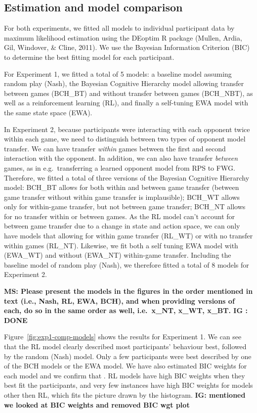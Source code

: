 \documentclass[english,man,floatsintext]{apa6}
\begin{document}
\hypertarget{estimation-and-model-comparison}{%
\subsection{Estimation and model comparison}\label{estimation-and-model-comparison}}

For both experiments, we fitted all models to individual participant data by maximum likelihood estimation using the DEoptim R package (Mullen, Ardia, Gil, Windover, \& Cline, 2011). We use the Bayesian Information Criterion (BIC) to determine the best fitting model for each participant.

For Experiment 1, we fitted a total of 5 models: a baseline model assuming random play (Nash), the Bayesian Cognitive Hierarchy model allowing transfer between games (BCH\_BT) and without transfer between games (BCH\_NBT), as well as a reinforcement learning (RL), and finally a self-tuning EWA model with the same state space (EWA).

In Experiment 2, because participants were interacting with each opponent twice within each game, we need to distinguish between two types of opponent model transfer. We can have transfer \emph{within} games between the first and second interaction with the opponent. In addition, we can also have transfer \emph{between} games, as in e.g.~transferring a learned opponent model from RPS to FWG. Therefore, we fitted a total of three versions of the Bayesian Cognitive Hierarchy model: BCH\_BT allows for both within and between game transfer (between game transfer without within game transfer is implausible); BCH\_WT allows only for within-game transfer, but not between game transfer; BCH\_NT allows for no transfer within or between games. As the RL model can't account for between game transfer due to a change in state and action space, we can only have models that allowing for within game transfer (RL\_WT) or with no transfer within games (RL\_NT). Likewise, we fit both a self tuning EWA model with (EWA\_WT) and without (EWA\_NT) within-game transfer. Including the baseline model of random play (Nash), we therefore fitted a total of 8 models for Experiment 2.

\textbf{MS: Please present the models in the figures in the order mentioned in text (i.e., Nash, RL, EWA, BCH), and when providing versions of each, do so in the same order as well, i.e.~x\_NT, x\_WT, x\_BT. IG : DONE }

Figure~\ref{fig:exp1-comp-models} shows the results for Experiment 1. We can see that the RL model clearly described most participants' behaviour best, followed by the random (Nash) model. Only a few participants were best described by one of the BCH models or the EWA model. We have also estimated BIC weights for each model and we confirm that . RL models have high BIC weights when they best fit the participants, and very few instances have high BIC weights for models other then RL, which fits the picture drawn by the histogram. \textbf{IG: mentioned we looked at BIC weights and removed BIC wgt plot }
\end{document}
